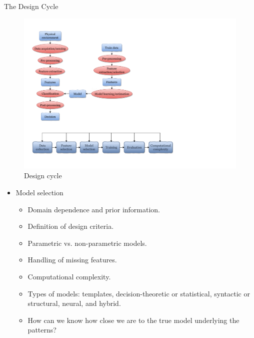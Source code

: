 \begin{frame}{The Design Cycle}
\begin{figure}
\includegraphics[width=\textwidth]{Figures/DesignCycle}
\caption{Design cycle}
\end{figure}
\vspace{-20pt}
\begin{itemize}
\item {\color{mycolor2}Model selection}
\begin{itemize}
\setlength{\itemsep}{3pt}
\item Domain dependence and prior information.
\item Definition of design criteria.
\item Parametric vs. non-parametric models.
\item Handling of missing features.
\item Computational complexity.
\item Types of models: templates, decision-theoretic or statistical, syntactic or structural, neural, and hybrid.
\item How can we know how close we are to the true model
underlying the patterns?
\end{itemize}
\end{itemize}
\end{frame}


